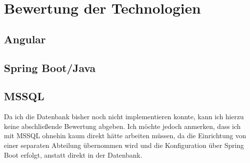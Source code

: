 \chapter{Bewertung der Technologien}\label{ch:experiments}
\section{Angular}
\section{Spring Boot/Java}
\section{MSSQL}
Da ich die Datenbank bisher noch nicht implementieren konnte, kann ich hierzu keine abschließende Bewertung abgeben.
Ich möchte jedoch anmerken, dass ich mit MSSQL ohnehin kaum direkt hätte arbeiten müssen, 
da die Einrichtung von einer separaten Abteilung übernommen wird und die Konfiguration über Spring Boot erfolgt, anstatt direkt in der Datenbank.